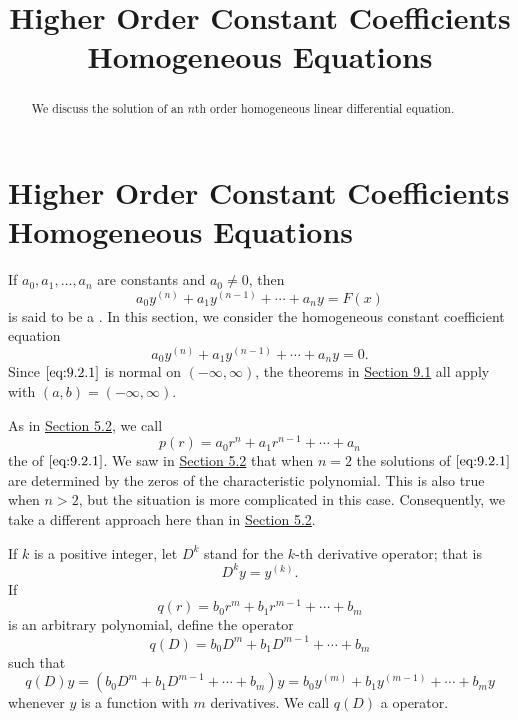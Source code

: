 \documentclass{ximera}
\title{Higher Order Constant Coefficients Homogeneous Equations}%
\begin{document}
\begin{abstract}
We discuss the solution of an $n$th order homogeneous linear differential equation.
\end{abstract}

\maketitle

\section*{Higher Order Constant Coefficients Homogeneous Equations}

If $a_0, a_1, \dots, a_n$ are constants and $a_0\neq 0$, then
$$
a_0y^{(n)}+a_1y^{(n-1)}+\cdots+a_ny=F(x)
$$
is said to be a .
In this section, we consider the homogeneous constant coefficient
equation
\begin{equation} \label{eq:9.2.1}
a_0y^{(n)}+a_1y^{(n-1)}+\cdots+a_ny=0.
\end{equation}
Since $\eqref{eq:9.2.1}$ is normal on $(-\infty,\infty)$, the theorems in
\href{https://xerxes.ximera.org/differentialequations/main/linearHigherOrder/linearHigherOrder}{Section 9.1} all apply with $(a,b)=(-\infty,\infty)$.

As in \href{https://xerxes.ximera.org/differentialequations/main/constantCoefficientHomogeneousEquations/constantCoefficientHomogeneousEquations}{Section 5.2}, we call
\begin{equation} \label{eq:9.2.2}
p(r)=a_0r^n+a_1r^{n-1}+\cdots+a_n
\end{equation}
the  of $\eqref{eq:9.2.1}$. We saw in
\href{https://xerxes.ximera.org/differentialequations/main/constantCoefficientHomogeneousEquations/constantCoefficientHomogeneousEquations}{Section 5.2} that when $n=2$ the solutions of $\eqref{eq:9.2.1}$ are
determined by the zeros of the characteristic polynomial. This is also
true when $n>2$, but the situation is more complicated in this case.
Consequently, we take a different approach here than in
\href{https://xerxes.ximera.org/differentialequations/main/constantCoefficientHomogeneousEquations/constantCoefficientHomogeneousEquations}{Section 5.2}.

If $k$ is a positive integer, let $D^k$ stand
for the $k$-th derivative operator;   that is
$$
D^ky=y^{(k)}.
$$
If
$$
q(r)=b_0r^m+b_1r^{m-1}+\cdots+b_m
$$
is an arbitrary polynomial,  define the operator
$$
q(D)=b_0D^m+b_1D^{m-1}+\cdots+b_m
$$
such that
$$
q(D)y=(b_0D^m+b_1D^{m-1}+\cdots+b_m)y=b_0y^{(m)}+b_1y^{(m-1)}+\cdots+
b_my
$$
whenever $y$ is a function with $m$ derivatives. We call $q(D)$
a   operator.
\end{document}
